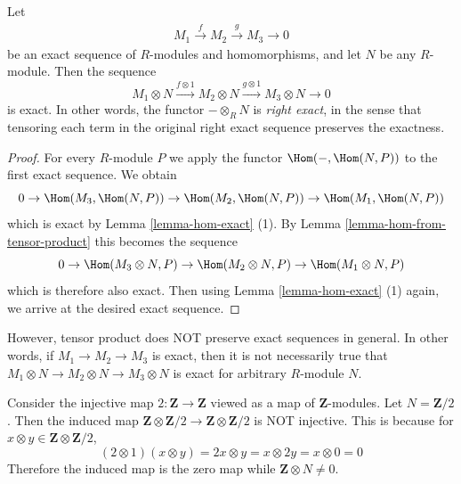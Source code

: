 \begin{lemma}
\label{lemma-tensor-product-exact}
Let
\begin{align*}
M_1\xrightarrow{f} M_2\xrightarrow{g} M_3 \to 0
\end{align*}
be an exact sequence of $R$-modules and homomorphisms, and let $N$ be any
$R$-module. Then the sequence
\begin{equation}
\label{equation-2ndex}
M_1\otimes N\xrightarrow{f \otimes 1} M_2\otimes N \xrightarrow{g \otimes 1}
M_3\otimes N \to 0
\end{equation}
is exact. In other words, the functor $- \otimes_R N$ is
{\it right exact}, in the sense that tensoring
each term in the original right exact sequence preserves the exactness.
\end{lemma}

\begin{proof}
For every $R$-module $P$
we apply the functor $\Hom(-, \Hom(N, P))$ to the first exact
sequence. We obtain
$$
0 \to
\Hom(M_3, \Hom(N, P)) \to
\Hom(M_2, \Hom(N, P)) \to
\Hom(M_1, \Hom(N, P))
$$
which is exact by Lemma \ref{lemma-hom-exact} (1).
By Lemma \ref{lemma-hom-from-tensor-product} this becomes the sequence
$$
0 \to \Hom(M_3 \otimes N, P) \to
\Hom(M_2 \otimes N, P) \to \Hom(M_1 \otimes N, P)
$$
which is therefore also exact. Then using
Lemma \ref{lemma-hom-exact} (1) again, we arrive at the desired exact sequence.
\end{proof}

\begin{remark}
\label{remark-tensor-product-not-exact}
However, tensor product does NOT preserve exact sequences in general.
In other words, if $M_1 \to M_2 \to M_3$ is
exact, then it is not necessarily true that
$M_1 \otimes N \to M_2 \otimes N \to M_3 \otimes N$
is exact for arbitrary $R$-module $N$.
\end{remark}

\begin{example}
\label{example-tensor-product-not-exact}
Consider the injective map $2 : \mathbf{Z}\to \mathbf{Z}$
viewed as a map of $\mathbf{Z}$-modules.
Let $N = \mathbf{Z}/2$. Then the induced map
$\mathbf{Z} \otimes \mathbf{Z}/2 \to \mathbf{Z} \otimes \mathbf{Z}/2$
is NOT injective. This is because for
$x \otimes y\in \mathbf{Z} \otimes \mathbf{Z}/2$,
$$
(2 \otimes 1)(x \otimes y) = 2x \otimes y = x \otimes 2y = x \otimes 0 = 0
$$
Therefore the induced map is the zero map while $\mathbf{Z} \otimes N\neq 0$.
\end{example}

